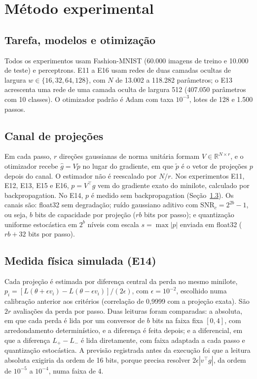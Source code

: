 \documentclass[journal]{IEEEtran}
\newcommand{\SNR}{\mathrm{SNR}}
\begin{document}
\section{Método experimental}

\subsection{Tarefa, modelos e otimização}

Todos os experimentos usam Fashion-MNIST (60.000 imagens de treino e 10.000 de teste) e perceptrons. E11 a E16 usam redes de duas camadas ocultas de largura $w \in \{16, 32, 64, 128\}$, com $N$ de 13.002 a 118.282 parâmetros; o E13 acrescenta uma rede de uma camada oculta de largura 512 (407.050 parâmetros com 10 classes). O otimizador padrão é Adam com taxa $10^{-3}$, lotes de 128 e 1.500 passos.

\subsection{Canal de projeções}

Em cada passo, $r$ direções gaussianas de norma unitária formam $V \in \mathbb{R}^{N\times r}$, e o otimizador recebe $\hat g = V\tilde p$ no lugar do gradiente, em que $\tilde p$ é o vetor de projeções $p$ depois do canal. O estimador não é reescalado por $N/r$. Nos experimentos E11, E12, E13, E15 e E16, $p = V^\top g$ vem do gradiente exato do minilote, calculado por backpropagation. No E14, $p$ é medido sem backpropagation (Seção~\ref{sec:e14m}). Os canais são: float32 sem degradação; ruído gaussiano aditivo com $\SNR_c = 2^{2b}-1$, ou seja, $b$ bits de capacidade por projeção ($rb$ bits por passo); e quantização uniforme estocástica em $2^b$ níveis com escala $s=\max|p|$ enviada em float32 ($rb+32$ bits por passo).

\subsection{Medida física simulada (E14)}
\label{sec:e14m}

Cada projeção é estimada por diferença central da perda no mesmo minilote, $p_i = [L(\theta+\epsilon v_i) - L(\theta-\epsilon v_i)]/(2\epsilon)$, com $\epsilon = 10^{-2}$, escolhido numa calibração anterior aos critérios (correlação de 0,9999 com a projeção exata). São $2r$ avaliações da perda por passo. Duas leituras foram comparadas: a absoluta, em que cada perda é lida por um conversor de $b$ bits na faixa fixa $[0, 4]$, com arredondamento determinístico, e a diferença é feita depois; e a diferencial, em que a diferença $L_+ - L_-$ é lida diretamente, com faixa adaptada a cada passo e quantização estocástica. A previsão registrada antes da execução foi que a leitura absoluta exigiria da ordem de 16 bits, porque precisa resolver $2\epsilon|v^\top g|$, da ordem de $10^{-5}$ a $10^{-4}$, numa faixa de 4.
\end{document}
